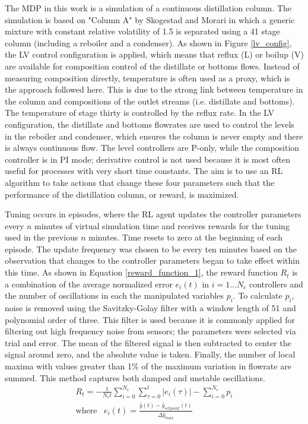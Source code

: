 The MDP in this work is a simulation of a continuous  distillation column. The simulation is based on "Column A" by Skogestad and Morari in which a generic mixture with constant relative volatility of 1.5 is separated using a 41 stage column (including a reboiler and a condenser).\cite{Skogestad1988} As shown in Figure \ref{lv_config}, the LV control configuration is applied, which means that reflux (L) or boilup (V) are available for composition control of the distillate or bottoms flows. Instead of measuring composition directly, temperature is often used as a proxy, which is the approach followed here.\cite{Wolff1996, Luyben2006} This is due to the strong link between temperature in the column and compositions of the outlet streams (i.e. distillate and bottoms).\cite{Luyben2006} The temperature of stage thirty is controlled by the reflux rate. In the LV configuration, the distillate and bottoms flowrates are used to control the levels in the reboiler and condenser, which ensures the column is never empty and there is always continuous flow.  The level controllers are P-only, while the composition controller is in PI mode; derivative control is not used because it is most often useful for processes with very short time constants. The aim is to use an RL algorithm to take actions that change these four parameters such that the performance of the distillation column, or reward, is maximized.

Tuning occurs in episodes, where the RL agent updates the controller parameters every $n$ minutes of virtual simulation time and receives rewards for the tuning used in the previous $n$ minutes. Time resets to zero at the beginning of each episode. The update frequency was chosen to be every ten minutes based on the observation that changes to the controller parameters began to take effect within this time. As shown in Equation \ref{reward_function_1}, the reward function $R_t$ is a combination of the average normalized error $e_i(t)$ in $i=1 \dots N_c$ controllers and the number of oscillations in each the manipulated variables $p_i$. To calculate $p_i$, noise is removed using the Savitzky-Golay filter with a window length of 51 and polynomial order of three. This filter is used because it is commonly applied for filtering out high frequency noise from sensors; the parameters were selected via trial and error. The mean of the filtered signal is then subtracted to center the signal around zero, and the absolute value is taken. Finally, the number of local maxima with values greater than 1\% of the maximum variation in flowrate are summed. This method captures both damped and unstable oscillations.
\begin{gather}
	\label{reward_function_1}	
 	R_t = - \frac{1}{N_c t}\sum_{i=0}^{N_c}\sum_{\tau=0}^t \lvert e_i(\tau) \rvert  - \sum_{i=0}^{N_c}p_i\\[2em]
 	\label{reward_function_2}	
	\text{where}\;\;\; 	e_i(t) = \frac{\hat y(t) - \hat y_{setpoint}(t)}{\Delta \hat y_{max}}
\end{gather}

